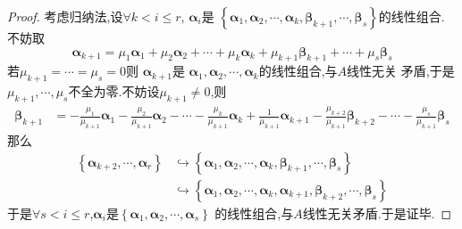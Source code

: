 {\begin{proof}
        考虑归纳法,设$\forall k < i \leqslant r$,
        $\bm{\alpha}_i$是
        $\left\{\bm{\alpha}_1,
            \bm{\alpha}_2,\cdots,\bm{\alpha}_k,
            \bm{\beta}_{k+1},\cdots,\bm{\beta}_s\right\}$的线性组合.
        不妨取
        \[
            \bm{\alpha}_{k+1}=\mu_{1}\bm{\alpha}_1+\mu_2\bm{\alpha}_2+\cdots+\mu_k\bm{\alpha}_k+
            \mu_{k+1}\bm{\beta}_{k+1}+\cdots+\mu_s\bm{\beta}_s
        \]
        若$\mu_{k+1}=\cdots=\mu_{s}=0$则
        $\bm{\alpha}_{k+1}$是
        $\bm{\alpha}_1,\bm{\alpha}_2,
            \cdots,\bm{\alpha}_k$的线性组合,与$A$线性无关
        矛盾,于是
        $\mu_{k+1},\cdots,\mu_s$不全为零.不妨设$\mu_{k+1}\neq 0$,则
        \begin{align*}
            \bm{\beta}_{k+1} & =
            -\frac{\mu_1}{\mu_{k+1}}\bm{\alpha}_1-
            \frac{\mu_2}{\mu_{k+1}}\bm{\alpha}_2-\cdots
            -\frac{\mu_k}{\mu_{k+1}}\bm{\alpha}_k+
            \frac{1}{\mu_{k+1}}\bm{\alpha}_{k+1}-
            \frac{\mu_{k+2}}{\mu_{k+1}}\bm{\beta}_{k+2}-
            \cdots-\frac{\mu_{s}}{\mu_{k+1}}\bm{\beta}_s
        \end{align*}
        那么
        \begin{align*}
            \left\{\bm{\alpha}_{k+2},\cdots,\bm{\alpha}_r\right\}
             & \hookrightarrow
            \left\{\bm{\alpha}_1,
            \bm{\alpha}_2,\cdots,\bm{\alpha}_k,
            \bm{\beta}_{k+1},\cdots,\bm{\beta}_s\right\} \\
             & \hookrightarrow
            \left\{\bm{\alpha}_1,
            \bm{\alpha}_2,\cdots,\bm{\alpha}_k,\bm{\alpha}_{k+1},
            \bm{\beta}_{k+2},\cdots,\bm{\beta}_s\right\}
        \end{align*}
        于是$\forall s < i \leqslant r$,$\bm{\alpha}_i$是$\left\{\bm{\alpha}_1,\bm{\alpha}_2,\cdots,\bm{\alpha}_s\right\}$
        的线性组合,与$A$线性无关矛盾.于是证毕.
    \end{proof}
}
